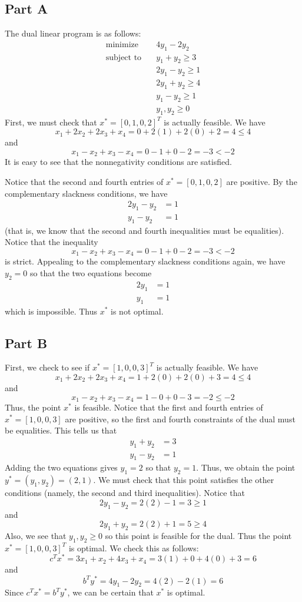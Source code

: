 \documentclass[12pt]{article}
\begin{document}
\subsection*{Part A}
The dual linear program is as follows:
\begin{align*}
\text{minimize}\quad &4y_1 -2y_2 \\
\text{subject to}\quad &y_1 + y_2 \geq 3\\
&2y_1-y_2 \geq 1\\
&2y_1 + y_2 \geq 4\\
&y_1 - y_2 \geq 1\\
&y_1,y_2 \geq 0
\end{align*}
First, we must check that $x^* = [0,1,0,2]^T$ is actually feasible. We have
\[
x_1+ 2x_2 + 2x_3 + x_4 = 0 + 2(1) + 2(0) + 2 = 4 \leq 4
\] and 
\[
x_1 - x_2 + x_3 - x_4 = 0 - 1 + 0 - 2 = -3 < -2
\] It is easy to see that the nonnegativity conditions are satisfied.

Notice that the second and fourth entries of $x^* =[0,1,0,2]$ are positive. By the complementary slackness conditions, we have
\begin{align*}
2y_1 - y_2 &= 1\\
y_1 - y_2 &= 1
\end{align*} (that is, we know that the second and fourth inequalities must be equalities). Notice that the inequality 
\[
x_1 - x_2 + x_3 - x_4 = 0 - 1 + 0 - 2 = -3 < -2
\] is strict. Appealing to the complementary slackness conditions again, we have $y_2 = 0$ so that the two equations become
\begin{align*}
2y_1  &= 1\\
y_1  &= 1
\end{align*} which is impossible. Thus $x^*$ is not optimal.
\subsection*{Part B}
First, we check to see if $x^* = [1,0,0,3]^T$ is actually feasible. We have
\[
x_1 + 2x_2 + 2x_3 + x_4 = 1 + 2(0) + 2(0) + 3 = 4 \leq 4
\] and
\[
x_1-x_2+x_3-x_4 = 1-0+0-3 = -2 \leq -2
\] Thus, the point $x^*$ is feasible. Notice that the first and fourth entries of $x^* = [1,0,0,3]$ are positive, so the first and fourth constraints of the dual must be equalities. This tells us that 
\begin{align*}
y_1 + y_2 &= 3\\
y_1 - y_2 &= 1
\end{align*}
 Adding the two equations gives $y_1 = 2$ so that $y_2 = 1$. Thus, we obtain the point $y^* = (y_1,y_2) = (2,1)$. We must check that this point satisfies the other conditions (namely, the second and third inequalities). Notice that
 \[
 2y_1 - y_2  = 2(2) - 1 = 3 \geq 1
 \] and
 \[
 2y_1 + y_2 = 2(2) + 1 = 5 \geq 4
 \] Also, we see that $y_1,y_2 \geq 0$ so this point is feasible for the dual. Thus the point $x^* = [1,0,0,3]^T$ is optimal. We check this as follows:
 \[
 c^T x^* = 3x_1 + x_2 + 4x_3 + x_4 = 3(1) + 0 + 4(0) + 3 = 6
 \] and
 \[
 b^T y^* = 4y_1 - 2y_2 = 4(2) - 2(1) = 6
 \] Since $c^Tx^* = b^T y^*$, we can be certain that $x^*$ is optimal.
\newpage
\end{document}
